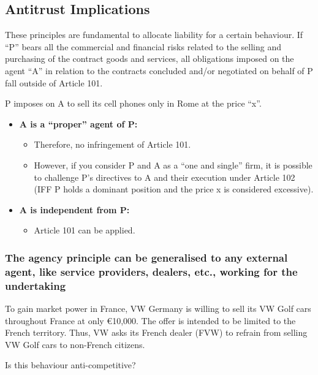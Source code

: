     \subsection{Antitrust Implications}

        These principles are fundamental to allocate liability for a certain behaviour. If ``P'' bears all the commercial and financial risks related to the selling and purchasing of the contract goods and services, all obligations imposed on the agent ``A'' in relation to the contracts concluded and/or negotiated on behalf of P fall outside of Article 101.

        P imposes on A to sell its cell phones only in Rome at the price ``x''.
        \begin{itemize}
            \item \textbf{A is a ``proper'' agent of P:}
            \begin{itemize}
                \item Therefore, no infringement of Article 101.
                \item However, if you consider P and A as a ``one and single'' firm, it is possible to challenge P’s directives to A and their execution under Article 102 (IFF P holds a dominant position and the price x is considered excessive).
            \end{itemize}
            
            \item \textbf{A is independent from P:}
            \begin{itemize}
                \item Article 101 can be applied.
            \end{itemize}
        \end{itemize}

        \subsubsection{The agency principle can be generalised to any external agent, like service providers, dealers, etc., working for the undertaking}

            To gain market power in France, VW Germany is willing to sell its VW Golf cars throughout France at only €10,000. The offer is intended to be limited to the French territory. Thus, VW asks its French dealer (FVW) to refrain from selling VW Golf cars to non-French citizens.

            Is this behaviour anti-competitive?
            
